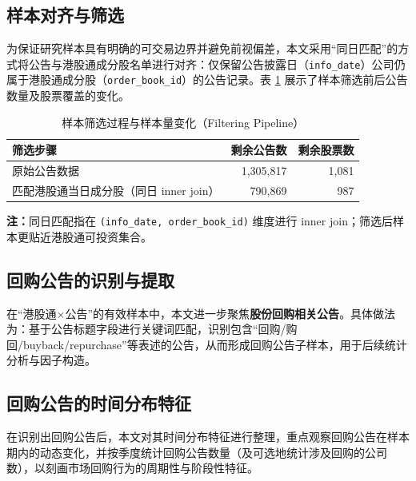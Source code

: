 \documentclass[a4paper,10pt]{article}
\begin{document}
\subsection{样本对齐与筛选}

为保证研究样本具有明确的可交易边界并避免前视偏差，本文采用“同日匹配”的方式将公告与港股通成分股名单进行对齐：仅保留公告披露日（\texttt{info\_date}）公司仍属于港股通成分股（\texttt{order\_book\_id}）的公告记录。表 \ref{tab:filtering} 展示了样本筛选前后公告数量及股票覆盖的变化。

\begin{table}[H]
    \centering
    \caption{样本筛选过程与样本量变化（Filtering Pipeline）}
    \label{tab:filtering}
    \begin{tabular}{lrr}
        \toprule
        \textbf{筛选步骤} & \textbf{剩余公告数} & \textbf{剩余股票数} \\
        \midrule
        原始公告数据 & 1,305,817 & 1,081 \\
        匹配港股通当日成分股（同日 inner join） & 790,869 & 987 \\
        \bottomrule
    \end{tabular}
    \vspace{0.2cm}
    \begin{flushleft}
        \footnotesize
        \textbf{注：}同日匹配指在 \texttt{(info\_date, order\_book\_id)} 维度进行 inner join；筛选后样本更贴近港股通可投资集合。
    \end{flushleft}
\end{table}

\subsection{回购公告的识别与提取}

在“港股通$\times$公告”的有效样本中，本文进一步聚焦\textbf{股份回购相关公告}。具体做法为：基于公告标题字段进行关键词匹配，识别包含“回购/购回/buyback/repurchase”等表述的公告，从而形成回购公告子样本，用于后续统计分析与因子构造。

\subsection{回购公告的时间分布特征}

在识别出回购公告后，本文对其时间分布特征进行整理，重点观察回购公告在样本期内的动态变化，并按季度统计回购公告数量（及可选地统计涉及回购的公司数），以刻画市场回购行为的周期性与阶段性特征。
\end{document}
